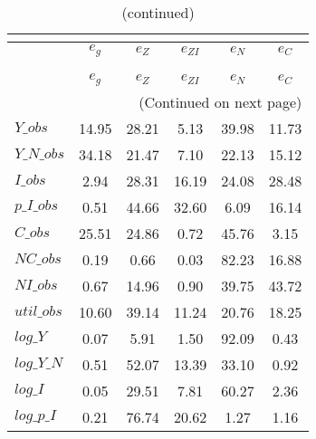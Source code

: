  
\begin{center}
\begin{longtable}{lccccc} 
\caption{VARIANCE DECOMPOSITION (in percent)}\\
 \label{Table:th_var_decomp_uncond}\\
\toprule 
$           $	 & 	 $       {e_g}$	 & 	 $       {e_Z}$	 & 	 $    {e_{ZI}}$	 & 	 $       {e_N}$	 & 	 $       {e_C}$\\
\midrule \endfirsthead 
\caption{(continued)}\\
 \toprule \\ 
$           $	 & 	 $       {e_g}$	 & 	 $       {e_Z}$	 & 	 $    {e_{ZI}}$	 & 	 $       {e_N}$	 & 	 $       {e_C}$\\
\midrule \endhead 
\midrule \multicolumn{6}{r}{(Continued on next page)} \\ \bottomrule \endfoot 
\bottomrule \endlastfoot 
$Y\_obs     $	 & 	       14.95	 & 	       28.21	 & 	        5.13	 & 	       39.98	 & 	       11.73 \\ 
$Y\_N\_obs  $	 & 	       34.18	 & 	       21.47	 & 	        7.10	 & 	       22.13	 & 	       15.12 \\ 
$I\_obs     $	 & 	        2.94	 & 	       28.31	 & 	       16.19	 & 	       24.08	 & 	       28.48 \\ 
$p\_I\_obs  $	 & 	        0.51	 & 	       44.66	 & 	       32.60	 & 	        6.09	 & 	       16.14 \\ 
$C\_obs     $	 & 	       25.51	 & 	       24.86	 & 	        0.72	 & 	       45.76	 & 	        3.15 \\ 
$NC\_obs    $	 & 	        0.19	 & 	        0.66	 & 	        0.03	 & 	       82.23	 & 	       16.88 \\ 
$NI\_obs    $	 & 	        0.67	 & 	       14.96	 & 	        0.90	 & 	       39.75	 & 	       43.72 \\ 
$util\_obs  $	 & 	       10.60	 & 	       39.14	 & 	       11.24	 & 	       20.76	 & 	       18.25 \\ 
$log\_Y     $	 & 	        0.07	 & 	        5.91	 & 	        1.50	 & 	       92.09	 & 	        0.43 \\ 
$log\_Y\_N  $	 & 	        0.51	 & 	       52.07	 & 	       13.39	 & 	       33.10	 & 	        0.92 \\ 
$log\_I     $	 & 	        0.05	 & 	       29.51	 & 	        7.81	 & 	       60.27	 & 	        2.36 \\ 
$log\_p\_I  $	 & 	        0.21	 & 	       76.74	 & 	       20.62	 & 	        1.27	 & 	        1.16 \\ 

\end{longtable}
\end{center}
